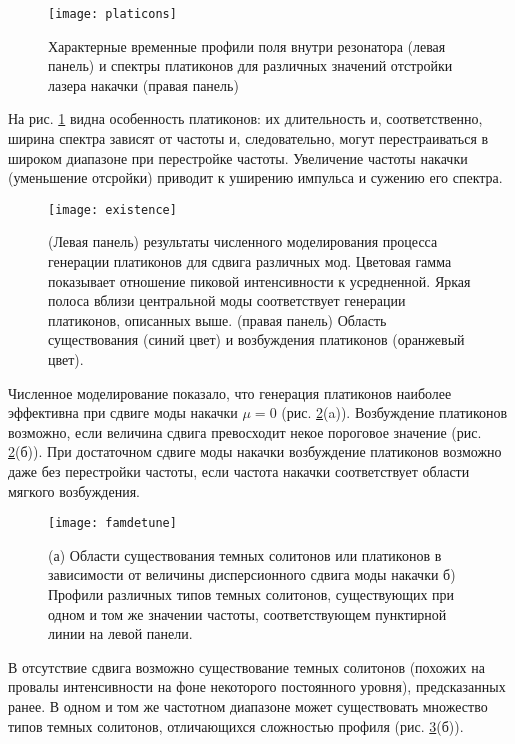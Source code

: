 \begin{figure}
  \centering
  \texttt{[image: platicons]}
  \caption{Характерные временные профили поля внутри резонатора (левая панель) и спектры платиконов для различных значений отстройки лазера накачки (правая панель)} \label{platicons}
\end{figure}


На рис. \ref{platicons} видна особенность платиконов: их длительность и, соответственно, ширина спектра зависят от частоты и, следовательно, могут перестраиваться в широком диапазоне при перестройке частоты. Увеличение частоты накачки (уменьшение отсройки) приводит к уширению импульса и сужению его спектра.

\begin{figure}
  \centering
  \texttt{[image: existence]}
  \caption{(Левая панель) результаты численного моделирования процесса генерации платиконов для сдвига различных мод. Цветовая гамма показывает отношение пиковой интенсивности к усредненной. Яркая полоса вблизи центральной моды соответствует генерации платиконов, описанных выше. (правая панель) Область существования (синий цвет) и возбуждения платиконов (оранжевый цвет).} \label{platicons_existence}
\end{figure}

Численное моделирование показало, что генерация платиконов наиболее эффективна при сдвиге моды накачки $\mu=0$ (рис. \ref{platicons_existence}(a)). Возбуждение платиконов возможно, если величина сдвига превосходит некое пороговое значение (рис. \ref{platicons_existence}(б)). При достаточном сдвиге моды накачки возбуждение платиконов возможно даже без перестройки частоты, если частота накачки соответствует области мягкого возбуждения.

\begin{figure}
  \centering
  \texttt{[image: famdetune]}
  \caption{(а) Области существования темных солитонов или платиконов в зависимости от величины дисперсионного сдвига моды накачки б) Профили различных типов темных солитонов, существующих при одном и том же значении частоты, соответствующем пунктирной линии на левой панели.} \label{platicons_famdetune}
\end{figure}

В отсутствие сдвига возможно существование темных солитонов (похожих на провалы интенсивности на фоне некоторого постоянного уровня), предсказанных ранее. В одном и том же частотном диапазоне может существовать множество типов темных солитонов, отличающихся сложностью профиля (рис. \ref{platicons_famdetune}(б)).

